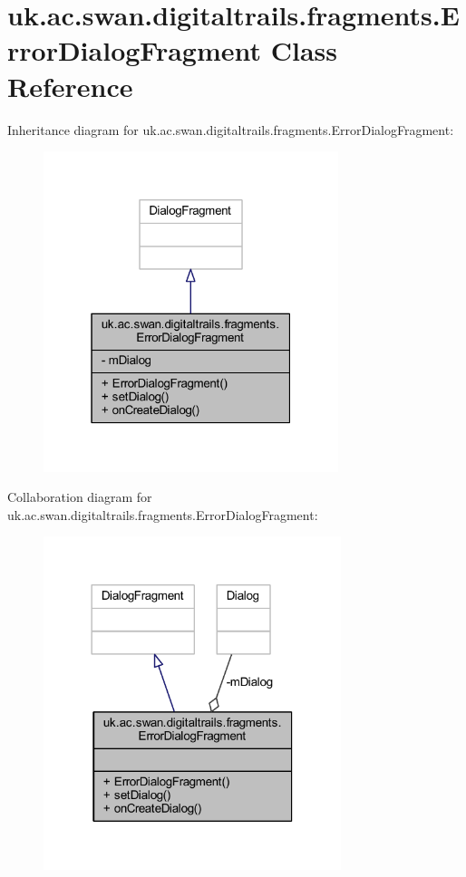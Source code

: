 \hypertarget{classuk_1_1ac_1_1swan_1_1digitaltrails_1_1fragments_1_1_error_dialog_fragment}{\section{uk.\+ac.\+swan.\+digitaltrails.\+fragments.\+Error\+Dialog\+Fragment Class Reference}
\label{classuk_1_1ac_1_1swan_1_1digitaltrails_1_1fragments_1_1_error_dialog_fragment}
}


Inheritance diagram for uk.\+ac.\+swan.\+digitaltrails.\+fragments.\+Error\+Dialog\+Fragment\+:
\nopagebreak
\begin{figure}[H]
\begin{center}
\leavevmode
\includegraphics[width=244pt]{classuk_1_1ac_1_1swan_1_1digitaltrails_1_1fragments_1_1_error_dialog_fragment__inherit__graph}
\end{center}
\end{figure}


Collaboration diagram for uk.\+ac.\+swan.\+digitaltrails.\+fragments.\+Error\+Dialog\+Fragment\+:
\nopagebreak
\begin{figure}[H]
\begin{center}
\leavevmode
\includegraphics[width=246pt]{classuk_1_1ac_1_1swan_1_1digitaltrails_1_1fragments_1_1_error_dialog_fragment__coll__graph}
\end{center}
\end{figure}
